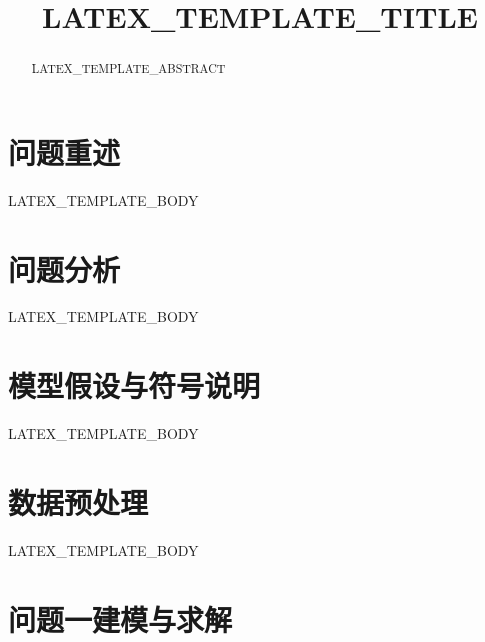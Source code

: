 \documentclass[withoutpreface,bwprint]{cumcmthesis}
\title{LATEX_TEMPLATE_TITLE}
\begin{document}
\maketitle


\begin{abstract}

  LATEX_TEMPLATE_ABSTRACT


\end{abstract}


\section{问题重述}

LATEX_TEMPLATE_BODY


\section{问题分析}

LATEX_TEMPLATE_BODY

\section{模型假设与符号说明}

LATEX_TEMPLATE_BODY

\section{数据预处理}

LATEX_TEMPLATE_BODY


\section{问题一建模与求解}
\end{document}
